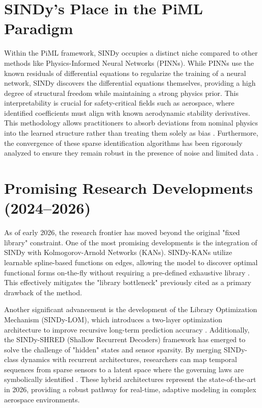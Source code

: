 \documentclass[12pt]{article}
\begin{document}
\section{SINDy’s Place in the PiML Paradigm}
Within the PiML framework, SINDy occupies a distinct niche compared to other methods like Physics-Informed Neural Networks (PINNs). While PINNs use the known residuals of differential equations to regularize the training of a neural network, SINDy discovers the differential equations themselves, providing a high degree of structural freedom while maintaining a strong physics prior. This interpretability is crucial for safety-critical fields such as aerospace, where identified coefficients must align with known aerodynamic stability derivatives. This methodology allows practitioners to absorb deviations from nominal physics into the learned structure rather than treating them solely as bias \cite{Kutz2023}. Furthermore, the convergence of these sparse identification algorithms has been rigorously analyzed to ensure they remain robust in the presence of noise and limited data \cite{Zhang2019}.

\section{Promising Research Developments (2024--2026)}
As of early 2026, the research frontier has moved beyond the original "fixed library" constraint. One of the most promising developments is the integration of SINDy with Kolmogorov-Arnold Networks (KANs). SINDy-KANs utilize learnable spline-based functions on edges, allowing the model to discover optimal functional forms on-the-fly without requiring a pre-defined exhaustive library \cite{Vaddireddy2026}. This effectively mitigates the "library bottleneck" previously cited as a primary drawback of the method.

Another significant advancement is the development of the Library Optimization Mechanism (SINDy-LOM), which introduces a two-layer optimization architecture to improve recursive long-term prediction accuracy \cite{Takeishi2026}. Additionally, the SINDy-SHRED (Shallow Recurrent Decoders) framework has emerged to solve the challenge of "hidden" states and sensor sparsity. By merging SINDy-class dynamics with recurrent architectures, researchers can map temporal sequences from sparse sensors to a latent space where the governing laws are symbolically identified \cite{Morales2026}. These hybrid architectures represent the state-of-the-art in 2026, providing a robust pathway for real-time, adaptive modeling in complex aerospace environments.
\end{document}
